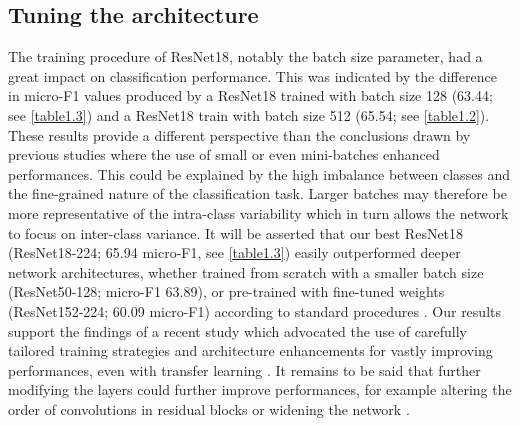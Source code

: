 \subsection{Tuning the architecture}\label{chapitre1_7.2}
The training procedure of ResNet18, notably the batch size parameter, had a great impact on classification performance. This was indicated by the difference in micro-F1 values produced by a ResNet18 trained with batch size 128 (63.44; see \autoref{table1.3}) and a ResNet18 train with batch size 512 (65.54; see \autoref{table1.2}). These results provide a different perspective than the conclusions drawn by previous studies \citep{masters_revisiting_2018, mishkin_systematic_2016} where the use of small or even mini-batches enhanced performances. This could be explained by the high imbalance between classes and the fine-grained nature of the classification task. Larger batches may therefore be more representative of the intra-class variability which in turn allows the network to focus on inter-class variance. It will be asserted that our best ResNet18 (ResNet18-224; 65.94 micro-F1, see \autoref{table1.3}) easily outperformed deeper network architectures, whether trained from scratch with a smaller batch size (ResNet50-128; micro-F1 63.89), or pre-trained with fine-tuned weights (ResNet152-224; 60.09 micro-F1) according to standard procedures \citep{king_comparison_2018}. Our results support the findings of a recent study which advocated the use of carefully tailored training strategies and architecture enhancements for vastly improving performances, even with transfer learning \citep{he_bag_2019}. It remains to be said that further modifying the layers could further improve performances, for example altering the order of convolutions in residual blocks \citep{he_bag_2019} or widening the network \citep{zagoruyko_wide_2016}.

